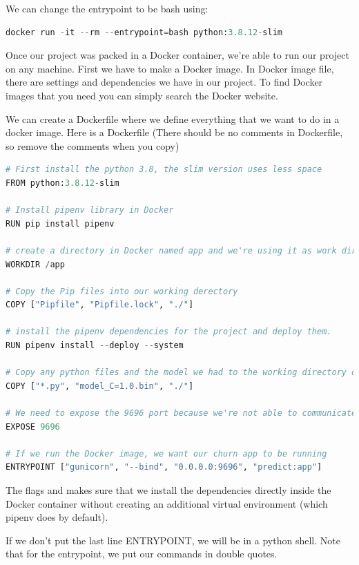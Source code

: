 \documentclass[letterpaper,12pt,notitlepage,twoside]{report}
\begin{document}
We can change the entrypoint to be bash using:
\begin{lstlisting}[language=python, numbers=none]
docker run -it --rm --entrypoint=bash python:3.8.12-slim
\end{lstlisting}

Once our project was packed in a Docker container, we're able to run our project on any machine.  First we have to make a Docker image. In Docker image file, there are settings and dependencies we have in our project. To find Docker images that you need you can simply search the Docker website. 

We can create a Dockerfile where we define everything that we want to do in a docker image. Here is a Dockerfile (There should be no comments in Dockerfile, so remove the comments when you copy)

\begin{lstlisting}[language=python, numbers=none]
# First install the python 3.8, the slim version uses less space
FROM python:3.8.12-slim

# Install pipenv library in Docker 
RUN pip install pipenv

# create a directory in Docker named app and we're using it as work directory 
WORKDIR /app                                                                

# Copy the Pip files into our working derectory 
COPY ["Pipfile", "Pipfile.lock", "./"]

# install the pipenv dependencies for the project and deploy them.
RUN pipenv install --deploy --system

# Copy any python files and the model we had to the working directory of Docker 
COPY ["*.py", "model_C=1.0.bin", "./"]

# We need to expose the 9696 port because we're not able to communicate with Docker outside it
EXPOSE 9696

# If we run the Docker image, we want our churn app to be running
ENTRYPOINT ["gunicorn", "--bind", "0.0.0.0:9696", "predict:app"]
\end{lstlisting}

The flags  and  makes sure that we install the dependencies directly inside the Docker container without creating an additional virtual environment (which pipenv does by default).

If we don't put the last line ENTRYPOINT, we will be in a python shell. Note that for the entrypoint, we put our commands in double quotes.
\end{document}
